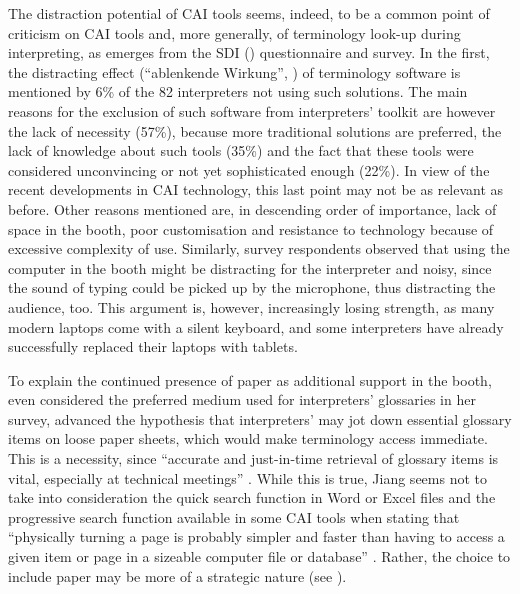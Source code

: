 The distraction potential of CAI tools seems, indeed, to be a common point of criticism on CAI tools and, more generally, of terminology look-up during interpreting, as emerges from the SDI (\citeyear{sdi_munchen_detaillierte_2007}) questionnaire and  survey. In the first, the distracting effect (``ablenkende Wirkung'', \citealt[29]{sdi_munchen_detaillierte_2007}) of terminology software is mentioned by 6\% of the 82 interpreters not using such solutions. The main reasons for the exclusion of such software from interpreters' toolkit are however the lack of necessity (57\%), because more traditional solutions are preferred, the lack of knowledge about such tools (35\%) and the fact that these tools were considered unconvincing or not yet sophisticated enough (22\%). In view of the recent developments in CAI technology, this last point may not be as relevant as before. Other reasons mentioned are, in descending order of importance, lack of space in the booth, poor customisation and resistance to technology because of excessive complexity of use. Similarly,  survey respondents observed that using the computer in the booth might be distracting for the interpreter and noisy, since the sound of typing could be picked up by the microphone, thus distracting the audience, too. This argument is, however, increasingly losing strength, as many modern laptops come with a silent keyboard, and some interpreters have already successfully replaced their laptops with tablets.

To explain the continued presence of paper as additional support in the booth, even considered the preferred medium used for interpreters' glossaries in her survey, \citet{jiang_interpreters_2013} advanced the hypothesis that interpreters' may jot down essential glossary items on loose paper sheets, which would make terminology access immediate. This is a necessity, since ``accurate and just-in-time retrieval of glossary items is vital, especially at technical meetings'' \citep[90]{jiang_interpreters_2013}. While this is true, Jiang seems not to take into consideration the quick search function in Word or Excel files and the progressive search function available in some CAI tools when stating that ``physically turning a page is probably simpler and faster than having to access a given item or page in a sizeable computer file or database'' \citep[91]{jiang_interpreters_2013}. Rather, the choice to include paper may be more of a strategic nature (see ).

